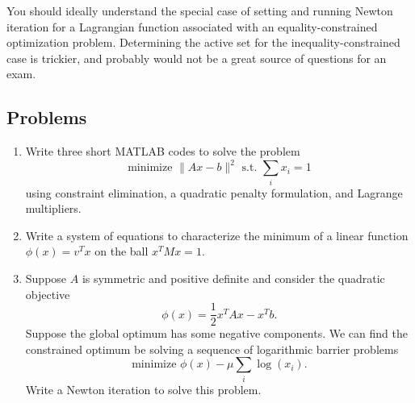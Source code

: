 \documentclass[12pt, leqno]{article}
\begin{document}
You should ideally understand the special case of setting and running
Newton iteration for a Lagrangian function associated with an
equality-constrained optimization problem.  Determining the
active set for the inequality-constrained case is trickier,
and probably would not be a great source of questions for
an exam.

\subsection{Problems}

\begin{enumerate}
\item
  Write three short MATLAB codes to solve the problem
  \[
    \mbox{minimize } \|Ax-b\|^2 \mbox{~s.t.~} \sum_{i} x_i = 1
  \]
  using constraint elimination, a quadratic penalty formulation,
  and Lagrange multipliers.
\item
  Write a system of equations to characterize the minimum of
  a linear function $\phi(x) = v^T x$ on the ball $x^T M x = 1$.
\item
  Suppose $A$ is symmetric and positive definite and consider
  the quadratic objective
  \[
    \phi(x) = \frac{1}{2} x^T A x - x^T b.
  \]
  Suppose the global optimum has some negative components.
  We can find the constrained optimum be solving a sequence of
  logarithmic barrier problems
  \[
    \mbox{minimize } \phi(x) - \mu \sum_i \log(x_i).
  \]
  Write a Newton iteration to solve this problem.
\end{enumerate}
\end{document}
